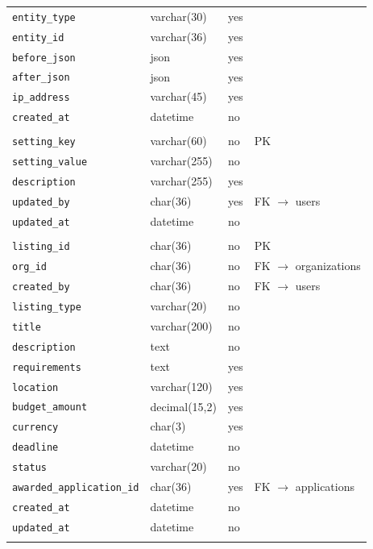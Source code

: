 {\begin{longtable}{L{4.2cm}L{3.4cm}L{1.1cm}L{5.0cm}}
\texttt{entity\_type} & varchar(30) & yes & \\
\texttt{entity\_id} & varchar(36) & yes & \\
\texttt{before\_json} & json & yes & \\
\texttt{after\_json} & json & yes & \\
\texttt{ip\_address} & varchar(45) & yes & \\
\texttt{created\_at} & datetime & no & \\
\\
\texttt{setting\_key} & varchar(60) & no & PK\\
\texttt{setting\_value} & varchar(255) & no & \\
\texttt{description} & varchar(255) & yes & \\
\texttt{updated\_by} & char(36) & yes & FK $\rightarrow$ users\\
\texttt{updated\_at} & datetime & no & \\
\\
\texttt{listing\_id} & char(36) & no & PK\\
\texttt{org\_id} & char(36) & no & FK $\rightarrow$ organizations\\
\texttt{created\_by} & char(36) & no & FK $\rightarrow$ users\\
\texttt{listing\_type} & varchar(20) & no & \\
\texttt{title} & varchar(200) & no & \\
\texttt{description} & text & no & \\
\texttt{requirements} & text & yes & \\
\texttt{location} & varchar(120) & yes & \\
\texttt{budget\_amount} & decimal(15,2) & yes & \\
\texttt{currency} & char(3) & yes & \\
\texttt{deadline} & datetime & no & \\
\texttt{status} & varchar(20) & no & \\
\texttt{awarded\_application\_id} & char(36) & yes & FK $\rightarrow$ applications\\
\texttt{created\_at} & datetime & no & \\
\texttt{updated\_at} & datetime & no & \\
\\

\end{longtable}}
